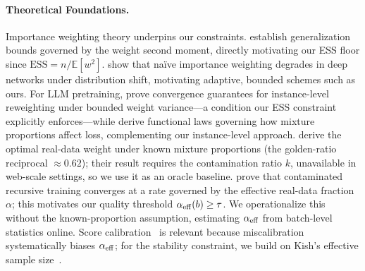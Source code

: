 \paragraph{Theoretical Foundations.}
Importance weighting theory underpins our constraints. \citet{cortes2010learning} establish generalization bounds governed by the weight second moment, directly motivating our ESS floor since $\mathrm{ESS} = n/\mathbb{E}[w^2]$.
\citet{fang2020rethinking} show that na\"ive importance weighting degrades in deep networks under distribution shift, motivating adaptive, bounded schemes such as ours.
For LLM pretraining, \citet{sow2025dynamic} prove convergence guarantees for instance-level reweighting under bounded weight variance---a condition our ESS constraint explicitly enforces---while \citet{ye2025mixing} derive functional laws governing how mixture proportions affect loss, complementing our instance-level approach.
\citet{he2025golden} derive the optimal real-data weight under known mixture proportions (the golden-ratio reciprocal ${\approx}0.62$); their result requires the contamination ratio $k$, unavailable in web-scale settings, so we use it as an oracle baseline.
\citet{wang2026survive} prove that contaminated recursive training converges at a rate governed by the effective real-data fraction $\alpha$; this motivates our quality threshold $\alpha_{\mathrm{eff}}(b) \geq \tau$.
We operationalize this without the known-proportion assumption, estimating $\alpha_{\mathrm{eff}}$ from batch-level statistics online.
Score calibration~\citep{guo2017calibration} is relevant because miscalibration systematically biases $\alpha_{\mathrm{eff}}$; for the stability constraint, we build on Kish's effective sample size~\citep{kish1965survey}.
